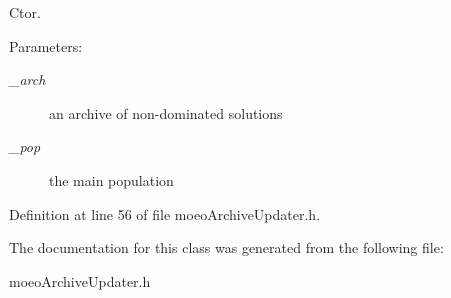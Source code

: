 Ctor. 

\begin{Desc}
\item[Parameters:]
\begin{description}
\item[{\em \_\-arch}]an archive of non-dominated solutions \item[{\em \_\-pop}]the main population \end{description}
\end{Desc}


Definition at line 56 of file moeo\-Archive\-Updater.h.

The documentation for this class was generated from the following file:\begin{CompactItemize}
\item 
moeo\-Archive\-Updater.h\end{CompactItemize}
